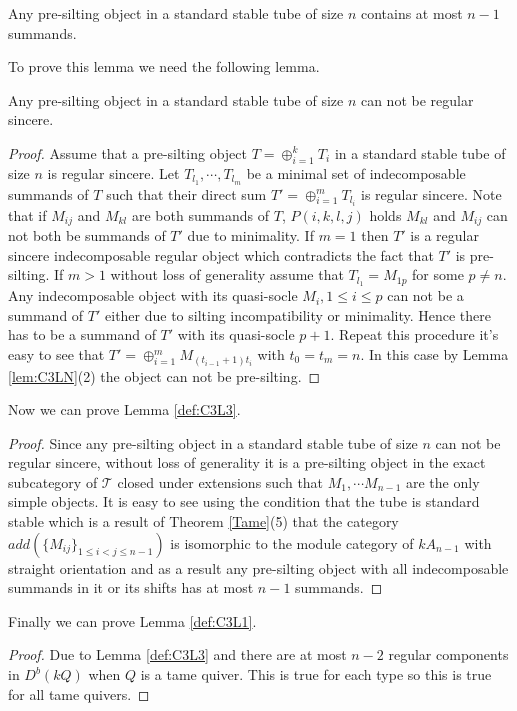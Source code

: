 \begin{lemma}\label{def:C3L3}
Any pre-silting object in a standard stable tube of size $n$ contains at most $n-1$ summands.
\end{lemma}
\indent To prove this lemma we need the following lemma.
\begin{lemma}\label{lem:C3L4}
Any pre-silting object in a standard stable tube of size $n$ can not be regular sincere.
\end{lemma}
\begin{proof}
\indent Assume that a pre-silting object $T=\oplus_{i=1}^k T_i$ in a standard stable tube of size $n$ is regular sincere. Let $T_{l_1},\cdots, T_{l_m}$ be a minimal set of indecomposable summands of $T$ such that their direct sum $T'=\oplus_{i=1}^m T_{l_i}$ is regular sincere. Note that if $M_{ij}$ and $M_{kl}$ are both summands of $T$, $P(i,k,l,j)$ holds $M_{kl}$ and $M_{ij}$ can not both be summands of $T'$ due to minimality. If $m=1$ then $T'$ is a regular sincere indecomposable regular object which contradicts the fact that $T'$ is pre-silting. If $m>1$ without loss of generality assume that $T_{l_1}=M_{1p}$ for some $p\neq n$. Any indecomposable object with its quasi-socle $M_i, 1\leq i\leq p$ can not be a summand of $T'$ either due to silting incompatibility or minimality. Hence there has to be a summand of $T'$ with its quasi-socle $p+1$. Repeat this procedure it's easy to see that $T'=\oplus_{i=1}^m M_{(t_{i-1}+1)t_i}$ with $t_0=t_m=n$. In this case by Lemma \ref{lem:C3LN}(2) the object can not be pre-silting.
\end{proof}
\indent Now we can prove Lemma \ref{def:C3L3}.
\begin{proof}
\indent Since any pre-silting object in a standard stable tube of size $n$ can not be regular sincere, without loss of generality it is a pre-silting object in the exact subcategory of $\mathcal{T}$ closed under extensions such that $M_1,\cdots M_{n-1}$ are the only simple objects. It is easy to see using the condition that the tube is standard stable which is a result of Theorem \ref{Tame}(5) that the category $add(\{M_{ij}\}_{1\leq i < j\leq n-1})$ is isomorphic to the module category of $kA_{n-1}$ with straight orientation and as a result any pre-silting object with all indecomposable summands in it or its shifts has at most $n-1$ summands. 
\end{proof}
\indent Finally we can prove Lemma \ref{def:C3L1}.
\begin{proof}
\indent Due to Lemma \ref{def:C3L3} and \cite{DR76} there are at most $n-2$ regular components in $D^b(kQ)$ when $Q$ is a tame quiver. This is true for each type so this is true for all tame quivers.
\end{proof}
